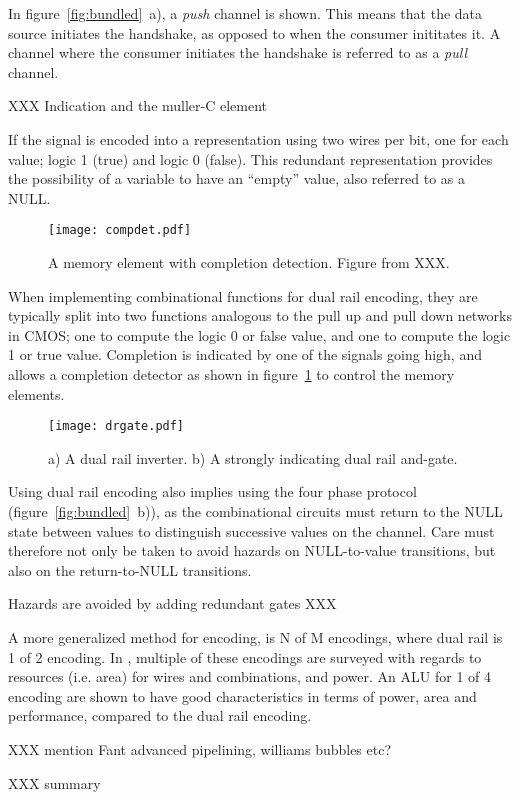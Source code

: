 In figure~\ref{fig:bundled}~a), a \emph{push} channel is shown. This means
that the data source initiates the handshake, as opposed to when the
consumer inititates it. A channel where the consumer initiates the
handshake is referred to as a \emph{pull} channel.

XXX Indication and the muller-C element

If the signal is encoded into a representation using two wires per
bit, one for each value; logic 1 (true) and logic 0 (false). This
redundant representation provides the possibility of a variable to
have an ``empty'' value, also referred to as a NULL. 

\begin{figure}[htbp]
  \centering
  \texttt{[image: compdet.pdf]}
  \caption{A memory element with completion detection. Figure from XXX.}
  \label{fig:compdet}
\end{figure}

When implementing combinational functions for dual rail encoding, they
are typically split into two functions analogous to the pull up and
pull down networks in CMOS; one to compute the logic 0 or false value,
and one to compute the logic 1 or true value. Completion is indicated
by one of the signals going high, and allows a completion detector as
shown in figure~\ref{fig:compdet} to control the memory elements.

\begin{figure}[htbp]
  \centering
  \texttt{[image: drgate.pdf]}
  \caption{a) A dual rail inverter. b) A strongly indicating dual rail
    and-gate.}
  \label{fig:drgate}
\end{figure}

Using dual rail encoding also implies using the four phase protocol
(figure~\ref{fig:bundled}~b)), as the combinational circuits must
return to the NULL state between values to distinguish successive
values on the channel. Care must therefore not only be taken to avoid
hazards on NULL-to-value transitions, but also on the return-to-NULL
transitions.

Hazards are avoided by adding redundant gates XXX

A more generalized method for encoding, is N of M encodings, where
dual rail is 1 of 2 encoding. In \cite[chapter 9]{nullconv}, multiple
of these encodings are surveyed with regards to resources (i.e. area)
for wires and combinations, and power. An ALU for 1 of 4 encoding are
shown to have good characteristics in terms of power, area and
performance, compared to the dual rail encoding. 

XXX mention Fant advanced pipelining, williams bubbles etc?

XXX summary
